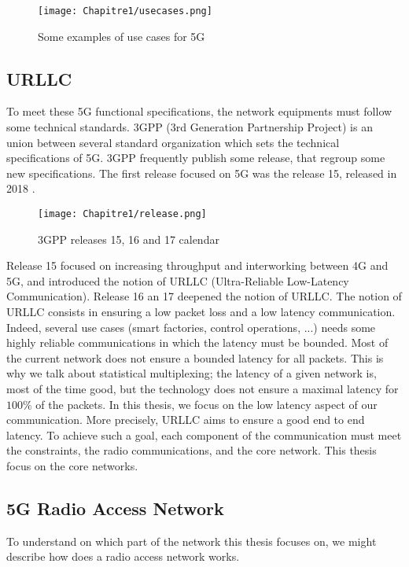   \begin{figure}[h] 
      \begin{center}
      \texttt{[image: Chapitre1/usecases.png]}
      \end{center}
      \caption{Some examples of use cases for 5G}\label{fig:usecases}
      \end{figure}
          
\subsection{URLLC}


To meet these 5G functional specifications, the network equipments must follow some technical standards. 3GPP (3rd Generation Partnership Project) is an union between several standard organization which sets the technical specifications of 5G. 3GPP frequently publish some release, that regroup some new specifications. The first release focused on 5G was the release 15, released in 2018 \cite{RELEASENOKIA}.  

  \begin{figure}[h]
      \begin{center}
      \texttt{[image: Chapitre1/release.png]}
      \end{center}
      \caption{3GPP releases 15, 16 and 17 calendar}\label{fig:release}
      \end{figure}
  
Release 15 focused on increasing throughput and interworking between 4G and 5G, and introduced the notion of URLLC (Ultra-Reliable Low-Latency Communication). Release 16 an 17 deepened the notion of URLLC. The notion of URLLC consists in ensuring a low packet loss and a low latency communication. Indeed, several use cases (smart factories, control operations, ...) needs some highly reliable communications in which the latency must be bounded. Most of the current network does not ensure a bounded latency for all packets. This is why we talk about statistical multiplexing; the latency of a given network is, most of the time good, but the technology does not ensure a maximal latency for $100\%$ of the packets.  In this thesis, we focus on the low latency aspect of our communication. More precisely, URLLC aims to ensure a good end to end latency. To achieve such a goal, each component of the communication must meet the constraints, the radio communications, and the core network. This thesis focus on the core networks. 

\subsection{5G Radio Access Network}
To understand on which part of the network this thesis focuses on, we might describe how does a radio access network works.

